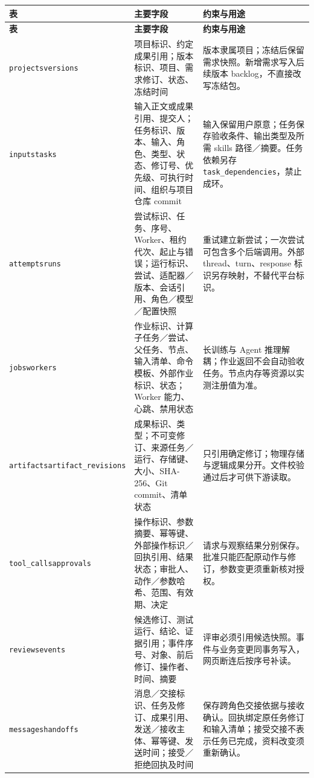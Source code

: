 \documentclass[11pt,a4paper]{article}
\begin{document}
\begingroup\small
\begin{longtable}{P{2.55cm}P{5.65cm}P{6.5cm}}
\toprule
\textbf{表} & \textbf{主要字段} & \textbf{约束与用途}\\
\midrule\endfirsthead
\toprule\textbf{表} & \textbf{主要字段} & \textbf{约束与用途}\\\midrule\endhead
\texttt{projects}\newline\texttt{versions} & 项目标识、约定成果引用；版本标识、项目、需求修订、状态、冻结时间 & 版本隶属项目；冻结后保留需求快照。新增需求写入后续版本 backlog，不直接改写冻结包。\\
\texttt{inputs}\newline\texttt{tasks} & 输入正文或成果引用、提交人；任务标识、版本、输入、角色、类型、状态、修订号、优先级、可执行时间、组织与项目仓库 commit & 输入保留用户原意；任务保存验收条件、输出类型及所需 skills 路径／摘要。任务依赖另存 \texttt{task\_dependencies}，禁止成环。\\
\texttt{attempts}\newline\texttt{runs} & 尝试标识、任务、序号、Worker、租约代次、起止与错误；运行标识、尝试、适配器／版本、会话引用、角色／模型／配置快照 & 重试建立新尝试；一次尝试可包含多个后端调用。外部 thread、turn、response 标识另存映射，不替代平台标识。\\
\texttt{jobs}\newline\texttt{workers} & 作业标识、计算子任务／尝试、父任务、节点、输入清单、命令模板、外部作业标识、状态；Worker 能力、心跳、禁用状态 & 长训练与 Agent 推理解耦；作业返回不会自动验收任务。节点内存等资源以实测注册值为准。\\
\texttt{artifacts}\newline\texttt{artifact\_\allowbreak revisions} & 成果标识、类型；不可变修订、来源任务／运行、存储键、大小、SHA-256、Git commit、清单状态 & 只引用确定修订；物理存储与逻辑成果分开。文件校验通过后才可供下游读取。\\
\texttt{tool\_calls}\newline\texttt{approvals} & 操作标识、参数摘要、幂等键、外部操作标识／回执引用、结果状态；审批人、动作／参数哈希、范围、有效期、决定 & 请求与观察结果分别保存。批准只能匹配原动作与修订，参数变更须重新核对授权。\\
\texttt{reviews}\newline\texttt{events} & 候选修订、测试运行、结论、证据引用；事件序号、对象、前后修订、操作者、时间、摘要 & 评审必须引用候选快照。事件与业务变更同事务写入，网页断连后按序号补读。\\
\texttt{messages}\newline\texttt{handoffs} & 消息／交接标识、任务及修订、成果引用、发送／接收主体、幂等键、发送时间；接受／拒绝回执及时间 & 保存跨角色交接依据与接收确认。回执绑定原任务修订和输入清单；接受交接不表示任务已完成，资料改变须重新确认。\\
\bottomrule
\end{longtable}
\endgroup
\end{document}
